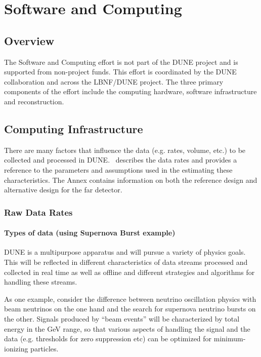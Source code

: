 \chapter{Software and Computing}
\label{ch:detectors-sc}

\section{Overview}

The Software and Computing effort is not part of the DUNE project and
is supported from non-project funds. This effort is coordinated by the
DUNE collaboration and across the LBNF/DUNE project. The three primary
components of the effort include the computing hardware, software
infrastructure and reconstruction.

\section{Computing Infrastructure}
\label{sec:detectors-sc-infrastructure}

There are many factors that influence the
data (e.g. rates, volume, etc.) to be collected and processed in DUNE.
\anxrates\ describes the data rates and
provides a reference to the parameters and assumptions used
in the estimating these characteristics.  The Annex
contains information on both the reference design and alternative
design for the far detector.

\subsection{Raw Data Rates}
\label{sec:detectors-sc-infrastructure-data-rates}


\subsubsection{Types of data (using Supernova Burst example)}
DUNE is a multipurpose apparatus and will pursue a variety of physics
goals.  This will be reflected in different
characteristics of data streams processed and collected in real time
as well as offline and different strategies and algorithms for
handling these streams.

As one example, consider the difference between neutrino oscillation
physics with beam neutrinos on the one hand and the search for supernova
neutrino bursts on the other.  Signals produced by ``beam events''
will be characterized by total energy in the GeV range, so that
various aspects of handling the signal and the data (e.g. thresholds
for zero suppression etc) can be optimized for minimum-ionizing
particles.

